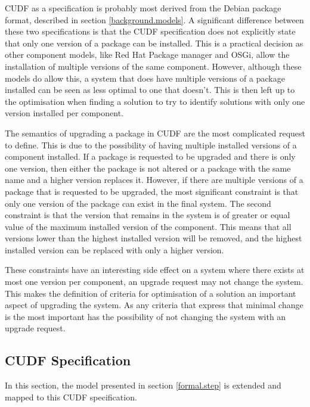 CUDF as a specification is probably most derived from the Debian package format, described in section \ref{background.models}.
A significant difference between these two specifications is that the CUDF specification does not explicitly state that only one version of a package can be installed.
This is a practical decision as other component models, like Red Hat Package manager and OSGi, allow the installation of multiple versions of the same component.
However, although these models do allow this, a system that does have multiple versions of a package installed can be seen as less optimal to one that doesn't. 
This is then left up to the optimisation when finding a solution to try to identify solutions with only one version installed per component.

The semantics of upgrading a package in CUDF are the most complicated request to define.
This is due to the possibility of having multiple installed versions of a component installed.
If a package is requested to be upgraded and there is only one version, then either the package is not altered or a package with the same name and a higher version replaces it.
However, if there are multiple versions of a package that is requested to be upgraded, the most significant constraint is that only one version of the package can exist in the final system.
The second constraint is that the version that remains in the system is of greater or equal value of the maximum installed version of the component.
This means that all versions lower than the highest installed version will be removed, and the highest installed version can be replaced with only a higher version.

These constraints have an interesting side effect on a system where there exists at most one version per component,
an upgrade request may not change the system.
This makes the definition of criteria for optimisation of a solution an important aspect of upgrading the system.
As any criteria that express that minimal change is the most important has the possibility of not changing the system with an upgrade request.

\subsection{CUDF Specification}
In this section, the model presented in section \ref{formal.step} is extended and mapped to this CUDF specification.

